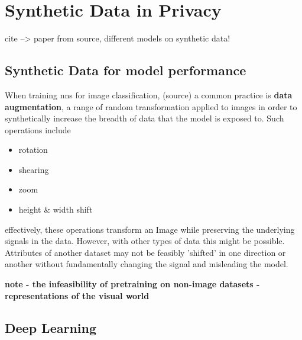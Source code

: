 \chapter{Synthetic Data in Privacy}

cite --> paper from source, different models on synthetic data!

\section{Synthetic Data for model performance}

When training \acp{nn} for image classification, (source) a common practice is \textbf{data augmentation}, a range of random transformation applied to images in order to synthetically increase the breadth of data that the model is exposed to. 
Such operations include 
\begin{itemize}
	\item rotation
	\item shearing
	\item zoom
	\item height \& width shift
\end{itemize}

effectively, these operations transform an Image while preserving the underlying signals in the data. However, with other types of data this might be possible. Attributes of another dataset may not be feasibly 'shifted' in one direction or another without fundamentally changing the signal and misleading the model.

\textbf{note - the infeasibility of pretraining on non-image datasets - representations of the visual world}

\section{Deep Learning}

